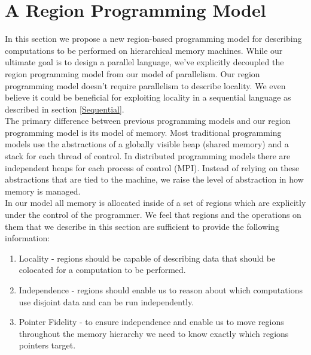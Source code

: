 \documentclass{article}
\theoremstyle{definition}
\begin{document}
\pagebreak


\section{A Region Programming Model \label{Regions}}

\noindent
In this section we propose a new region-based programming model for describing
computations to be performed on hierarchical memory machines.  
While our ultimate goal is to design a parallel language, we've explicitly
decoupled the region programming model from our model of parallelism.  Our region
programming model doesn't require parallelism to describe locality.  We even believe
it could be beneficial for exploiting locality in a sequential language as described
in section \ref{Sequential}. \\

\noindent
The primary difference between previous programming models and our region programming
model is its model of memory.  Most traditional programming models use the
abstractions of a globally visible heap (shared memory) and a stack for each thread
of control.  In distributed programming models there are independent heaps for each
process of control (MPI).  Instead of relying on these abstractions that are tied
to the machine, we raise the level of abstraction in how memory is managed.\\

\noindent
In our model all memory is allocated inside of a set of regions which are explicitly
under the control of the programmer.  We feel that regions and the operations on them
that we describe in this section are sufficient to provide the following information:

\begin{enumerate}
\item Locality - regions should be capable of describing data that
should be colocated for a computation to be performed.
\item Independence - regions should enable us to reason about which computations
use disjoint data and can be run independently.
\item Pointer Fidelity - to ensure independence and enable us to move regions
throughout the memory hierarchy we need to know exactly which regions pointers target.
\end{enumerate} 
\end{document}
